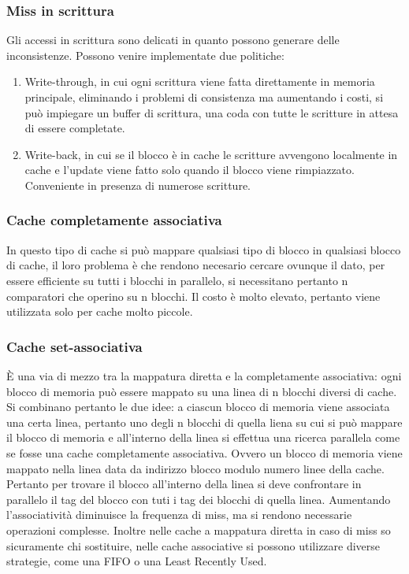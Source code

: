 \subsubsection{Miss in scrittura}
Gli accessi in scrittura sono delicati in quanto possono generare delle inconsistenze. Possono venire implementate due politiche:
\begin{enumerate}
\item Write-through, in cui ogni scrittura viene fatta direttamente in memoria principale, eliminando i problemi di consistenza ma aumentando i costi, si pu\`o impiegare
un buffer di scrittura, una coda con tutte le scritture in attesa di essere completate.
\item Write-back, in cui se il blocco \`e in cache le scritture avvengono localmente in cache e l'update viene fatto solo quando il blocco viene rimpiazzato. Conveniente
in presenza di numerose scritture. 
\end{enumerate}
\subsubsection{Cache completamente associativa}
In questo tipo di cache si pu\`o mappare qualsiasi tipo di blocco in qualsiasi blocco di cache, il loro problema \`e che rendono necesario cercare ovunque il dato, per
essere efficiente su tutti i blocchi in parallelo, si necessitano pertanto n comparatori che operino su n blocchi. Il costo \`e molto elevato, pertanto viene utilizzata 
solo per cache molto piccole. 
\subsubsection{Cache set-associativa}
\`E una via di mezzo tra la mappatura diretta e la completamente associativa: ogni blocco di memoria pu\`o essere mappato su una linea di n blocchi diversi di cache. Si combinano pertanto le due idee: a 
ciascun blocco di memoria viene associata una certa linea, pertanto uno degli n blocchi di quella liena su cui si pu\`o mappare il blocco di memoria e all'interno della linea si effettua una ricerca parallela come
se fosse una cache completamente associativa.  Ovvero un blocco di memoria viene mappato nella linea data da indirizzo blocco modulo numero linee della cache. Pertanto per trovare il blocco all'interno della
linea si deve confrontare in parallelo il tag del blocco con tuti i tag dei blocchi di quella linea.  Aumentando l'associativit\`a diminuisce la frequenza di miss, ma si rendono necessarie operazioni complesse. 
Inoltre nelle cache a mappatura diretta in caso di miss so sicuramente chi sostituire, nelle cache associative si possono utilizzare diverse strategie, come una FIFO o una Least Recently Used.
